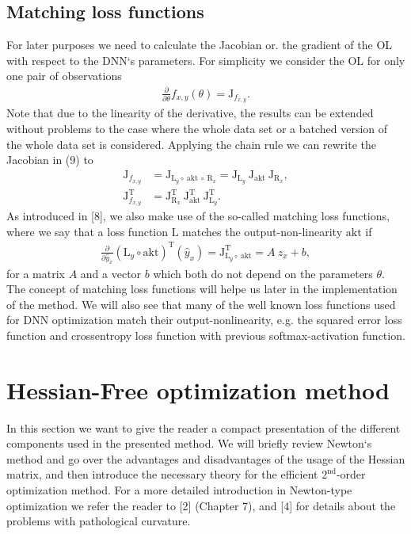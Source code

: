 \documentclass[conference]{IEEEtran}
\begin{document}
\subsection{Matching loss functions}
For later purposes we need to calculate the Jacobian or. the gradient of the OL with respect to the DNN`s parameters. For simplicity we consider the OL for only one pair of observations
\begin{align}
\frac{\partial}{\partial\theta}f_{x, y}(\theta) = \mathrm{J}_{f_{x, y}}.
\end{align}
Note that due to the linearity of the derivative, the results can be extended without problems to the case where the whole data set or a batched version of the whole data set is considered.
Applying the chain rule we can rewrite the Jacobian in (9) to
\begin{align}
\mathrm{J}_{f_{x, y}} &= \mathrm{J}_{\mathrm{L}_{y}\circ \:\text{akt} \:\circ\:\mathrm{R}_{x}} = \mathrm{J}_{\mathrm{L}_{y}} \: \mathrm{J}_{\text{akt}} \: \mathrm{J}_{\mathrm{R}_{x}},\\
\mathrm{J}_{f_{x, y}}^{\mathrm{T}} &= \mathrm{J}_{\mathrm{R}_{x}}^{\mathrm{T}} \: \mathrm{J}_{\text{akt}}^{\mathrm{T}} \: \mathrm{J}_{\mathrm{L}_{y}}^{\mathrm{T}}.
\end{align}
As introduced in [8], we also make use of the so-called matching loss functions, where we say that a loss function $\mathrm{L}$ matches the output-non-linearity $\text{akt}$ if
\begin{align}
\frac{\partial}{\partial\hat{y}_{x}}\left(\mathrm{L}_{y}\circ \text{akt}\right)^{\mathrm{T}}(\hat{y}_{x})= \mathrm{J}_{\mathrm{L}_{y}\circ \:\text{akt}}^{\mathrm{T}} = A\: z_{x} + b,
\end{align}
for a matrix $A$ and a vector $b$ which both do not depend on the parameters $\theta$.
The concept of matching loss functions will helpe us later in the implementation of the method. We will also see that many of the well known loss functions used for DNN optimization match their output-nonlinearity, e.g. the squared error loss function and crossentropy loss function with previous softmax-activation function.


\section{Hessian-Free optimization method}
In this section we want to give the reader a compact presentation of the different components used in the presented method. We will briefly review Newton`s method and go over the advantages and disadvantages of the usage of the Hessian matrix, and then introduce the necessary theory for the efficient $2^{\text{nd}}$-order optimization method. For a more detailed introduction in Newton-type optimization we refer the reader to [2] (Chapter 7), and [4] for details about the problems with pathological curvature. 
\end{document}
